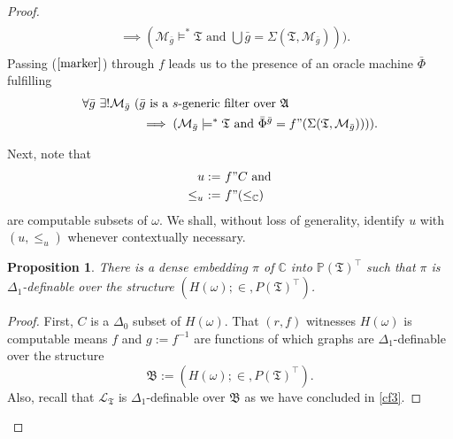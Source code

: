 \documentclass[12pt, twoside]{memoir}
\numberwithin{equation}{section}
\newtheorem{prop}[thm]{Proposition}
\theoremstyle{definition}
\theoremstyle{remark}
\theoremstyle{definition}
\theoremstyle{definition}
\theoremstyle{definition}
\theoremstyle{remark}
\begin{document}
\begin{proof}
\begin{align}
\begin{split}
    & \implies (\mathcal{M}_{\bar{g}} \models^* \mathfrak{T} \text{ and } \bigcup \bar{g} = \Sigma(\mathfrak{T}, \mathcal{M}_{\bar{g}}))) \text{.}
\end{split}
\end{align}
Passing ($\ref{marker}$) through $f$ leads us to the presence of an oracle machine $\bar{\Phi}$ fulfilling
\begin{align}\label{marker2}
\begin{split}
    \forall \bar{g} \ \exists ! \mathcal{M}_{\bar{g}} \ ( & \bar{g} \text{ is a } s \text{-generic filter over } \mathfrak{A} \\ 
    & \implies (\mathcal{M}_{\bar{g}} \models^* \mathfrak{T} \text{ and } \bar{\Phi}^{\bar{g}} = f" (\Sigma(\mathfrak{T}, \mathcal{M}_{\bar{g}})))) \text{.}
\end{split}
\end{align}

Next, note that 
\begin{align*}
    u := \ & f" C \text{ and} \\
    \leq_u \ := \ & f" (\leq_{\mathbb{C}})
\end{align*}
are computable subsets of $\omega$. We shall, without loss of generality, identify $u$ with $(u, \leq_u)$ whenever contextually necessary.

\begin{prop}\label{notlastp}
There is a dense embedding $\pi$ of $\mathbb{C}$ into $\mathbb{P}(\mathfrak{T})^{\top}$ such that $\pi$ is $\Delta_1$-definable over the structure $(H(\omega); \in, P(\mathfrak{T})^{\top})$.
\end{prop}

\begin{proof}
First, $C$ is a $\Delta_0$ subset of $H(\omega)$. That $(r, f)$ witnesses $H(\omega)$ is computable means $f$ and $g := f^{-1}$ are functions of which graphs are $\Delta_1$-definable over the structure $$\mathfrak{B} := (H(\omega); \in, P(\mathfrak{T})^{\top}).$$ Also, recall that $\mathcal{L}_{\mathfrak{T}}$ is $\Delta_1$-definable over $\mathfrak{B}$ as we have concluded in \ref{cf3}.  


\end{proof}
\end{proof}
\end{document}
